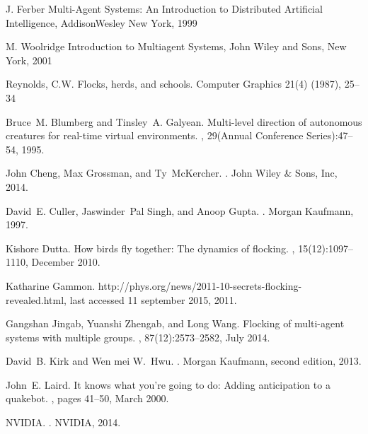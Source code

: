 \documentclass[journal,transmag]{IEEEtran}
\begin{document}
\begin{thebibliography}{1}

J. Ferber
\newblock Multi-Agent Systems: An Introduction to Distributed Artificial
Intelligence, AddisonWesley
\newblock New York, 1999

M. Woolridge
\newblock Introduction to Multiagent Systems, John Wiley and Sons,
\newblock New York, 2001

Reynolds, C.W.
\newblock Flocks, herds, and schools.
\newblock Computer Graphics 21(4) (1987), 25–34

Bruce~M. Blumberg and Tinsley~A. Galyean.
\newblock Multi-level direction of autonomous creatures for real-time virtual
  environments.
, 29(Annual Conference Series):47--54, 1995.

John Cheng, Max Grossman, and Ty~McKercher.
.
\newblock John Wiley \& Sons, Inc, 2014.

David~E. Culler, Jaswinder~Pal Singh, and Anoop Gupta.
.
\newblock Morgan Kaufmann, 1997.

Kishore Dutta.
\newblock How birds fly together: The dynamics of flocking.
, 15(12):1097--1110, December 2010.

Katharine Gammon.
\newblock http://phys.org/news/2011-10-secrets-flocking-revealed.html, last
  accessed 11 september 2015, 2011.

Gangshan Jingab, Yuanshi Zhengab, and Long Wang.
\newblock Flocking of multi-agent systems with multiple groups.
, 87(12):2573–2582, July
  2014.

David~B. Kirk and Wen mei W.~Hwu.
.
\newblock Morgan Kaufmann, second edition, 2013.

John~E. Laird.
\newblock It knows what you're going to do: Adding anticipation to a quakebot.
, pages 41--50, March 2000.

NVIDIA.
.
\newblock NVIDIA, 2014.


\end{thebibliography}
\end{document}
